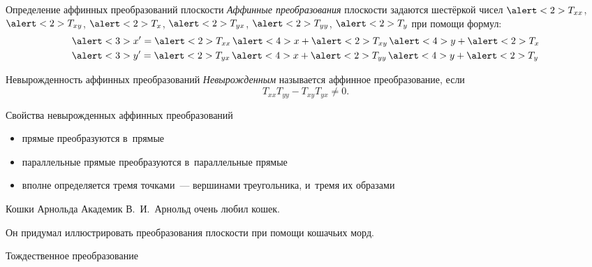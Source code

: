 {}

\begin{frame}{Определение аффинных преобразований плоскости}
\emph{Аффинные преобразования} плоскости задаются шестёркой чисел $\alert<2>{T_{xx}}$,
$\alert<2>{T_{xy}}$, $\alert<2>{T_x}$, $\alert<2>{T_{yx}}$,
$\alert<2>{T_{yy}}$, $\alert<2>{T_y}$ при помощи формул:
{\LARGE
	\[
	\begin{aligned}
	&\alert<3>{x'}=\alert<2>{T_{xx}}\,\alert<4>{x}+\alert<2>{T_{xy}}\,\alert<4>{y}+\alert<2>{T_x}\\
	&\alert<3>{y'}=\alert<2>{T_{yx}}\,\alert<4>{x}+\alert<2>{T_{yy}}\,\alert<4>{y}+\alert<2>{T_y}
	\end{aligned}
	\]
}

\end{frame}

\begin{frame}{Невырожденность аффинных преобразований}
\emph{Невырожденным} называется аффинное преобразование, если
{\LARGE
	\[
	T_{xx}T_{yy}-T_{xy}T_{yx}\ne0.
	\]
}
\end{frame}

\begin{frame}{Свойства невырожденных аффинных преобразований}
\begin{itemize}
\item
прямые преобразуются в~прямые
\item
параллельные прямые преобразуются в~параллельные прямые
\item
вполне определяется тремя точками~— вершинами треугольника, и~тремя их образами
\end{itemize}
\end{frame}

\begin{frame}{Кошки Арнольда}
Академик В.~И.~Арнольд очень любил кошек.

Он придумал иллюстрировать преобразования плоскости при помощи кошачьих морд.
\bigskip
\begin{center}
%
%
\end{center}
\end{frame}

\begin{frame}{Тождественное преобразование}
\begin{center}
\LARGE
\\[4ex]
%
\end{center}
\end{frame}

